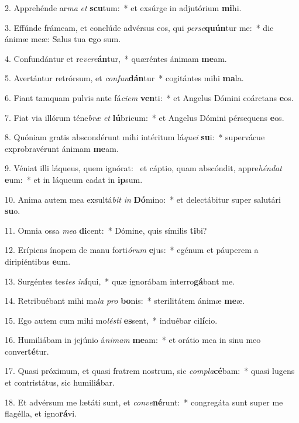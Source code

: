 2. Apprehénde ar\textit{ma} \textit{et} \textbf{scu}tum:~*  et exsúrge in adjutórium \textbf{mi}hi.\

3. Effúnde frámeam, et conclúde advérsus eos, qui \textit{per}\textit{se}\textbf{quún}tur me:~*  dic ánimæ meæ: Salus tua \textbf{e}go sum.\

4. Confundántur et re\textit{ve}\textit{re}\textbf{án}tur,~*  quæréntes ánimam \textbf{me}am.\

5. Avertántur retrórsum, et \textit{con}\textit{fun}\textbf{dán}tur~*  cogitántes mihi \textbf{ma}la.\

6. Fiant tamquam pulvis ante fá\textit{ci}\textit{em} \textbf{ven}ti:~*  et Angelus Dómini coárctans \textbf{e}os.\

7. Fiat via illórum téne\textit{bræ} \textit{et} \textbf{lú}bricum:~*  et Angelus Dómini pérsequens \textbf{e}os.\

8. Quóniam gratis abscondérunt mihi intéritum lá\textit{que}\textit{i} \textbf{su}i:~*  supervácue exprobravérunt ánimam \textbf{me}am.\

9. Véniat illi láqueus, quem ignórat: \dag\  et cáptio, quam abscóndit, appre\textit{hén}\textit{dat} \textbf{e}um:~*  et in láqueum cadat in \textbf{ip}sum.\

10. Anima autem mea exsultá\textit{bit} \textit{in} \textbf{Dó}mino:~*  et delectábitur super salutári \textbf{su}o.\

11. Omnia ossa \textit{me}\textit{a} \textbf{di}cent:~*  Dómine, quis símilis \textbf{ti}bi?\

12. Erípiens ínopem de manu forti\textit{ó}\textit{rum} \textbf{e}jus:~*  egénum et páuperem a diripiéntibus \textbf{e}um.\

13. Surgéntes tes\textit{tes} \textit{in}\textbf{í}qui,~*  quæ ignorábam interro\textbf{gá}bant me.\

14. Retribuébant mihi ma\textit{la} \textit{pro} \textbf{bo}nis:~*  sterilitátem ánimæ \textbf{me}æ.\

15. Ego autem cum mihi mo\textit{lés}\textit{ti} \textbf{es}sent,~*  induébar ci\textbf{lí}cio.\

16. Humiliábam in jejúnio á\textit{ni}\textit{mam} \textbf{me}am:~*  et orátio mea in sinu meo conver\textbf{té}tur.\

17. Quasi próximum, et quasi fratrem nostrum, sic \textit{com}\textit{pla}\textbf{cé}bam:~*  quasi lugens et contristátus, sic humili\textbf{á}bar.\

18. Et advérsum me lætáti sunt, et \textit{con}\textit{ve}\textbf{né}runt:~*  congregáta sunt super me flagélla, et igno\textbf{rá}vi.\

